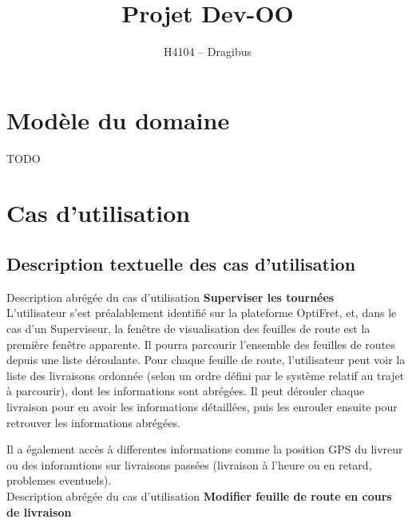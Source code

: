 \documentclass[a4paper]{article}
\begin{document}
\title{Projet Dev-OO}
\author{H4104 -- Dragibus}

\maketitle
\pagebreak

\tableofcontents
\pagebreak


\section{Modèle du domaine}
{\huge TODO}

\section{Cas d'utilisation}

\subsection{Description textuelle des cas d'utilisation}

Description abrégée du cas d'utilisation
\textbf{Superviser les tournées} \\

L'utilisateur s'est préalablement identifié sur la plateforme OptiFret, et,
dans le cas d'un Superviseur, la fenêtre de visualisation des feuilles de route
est la première fenêtre apparente. Il pourra parcourir l'ensemble des feuilles
de routes depuis une liste déroulante. Pour chaque feuille de route,
l'utilisateur peut voir la liste des livraisons ordonnée (selon un ordre défini
par le système relatif au trajet à parcourir), dont les informations sont
abrégées. Il peut dérouler chaque livraison pour en avoir les informations
détaillées, puis les enrouler ensuite pour retrouver les informations abrégées.

Il a également accès à differentes informations comme la position GPS du
livreur ou des inforamtions sur livraisons passées (livraison à l'heure ou en
retard, problemes eventuels). \\


Description abrégée du cas d'utilisation
\textbf{Modifier feuille de route en cours de livraison} \\
\end{document}
